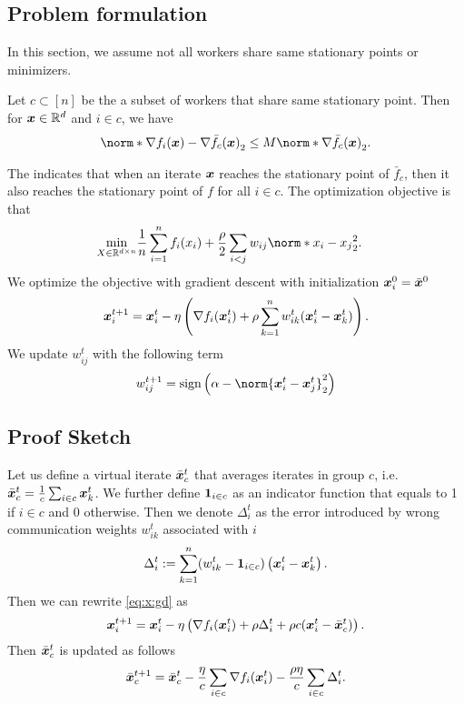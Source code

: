 \documentclass{article}
\begin{document}
\subsection{Problem formulation}
In this section, we assume not all workers share same stationary points or minimizers. 
\begin{assumption}\label{a:strong-growth}
  Let $c\subset[n]$ be the a subset of workers that share same stationary point. Then for $\bm{x}\in\mathbb{R}^d$ and $i\in c$, we have
  \begin{align*}
    \norm*{\nabla f_i(\xx) - \nabla \bar{f}_c(\xx)}_2 \le M \norm*{\nabla \bar{f}_c(\xx)}_2.
  \end{align*}
\end{assumption}
The  indicates that when an iterate $\bm{x}$ reaches the stationary point of $\bar{f}_c$, then it also reaches the stationary point of $f$ for all $i\in c$. The optimization objective is that
\begin{align*}
  \min_{X\in\mathbb{R}^{d\times n}}&  \frac{1}{n} \sum_{i=1}^n f_i(x_i) + \frac{\rho}{2} \sum_{i<j} w_{ij}\norm*{x_{i} - x_{j}}_2^2.
\end{align*}
We optimize the objective with gradient descent with initialization $\bm{x}_i^0=\bar{\bm{x}}^0$
\begin{equation}\label{eq:x:gd}
    \bm{x}_i^{t+1}=\bm{x}_i^t - \eta \left(
      \nabla f_i(\bm{x}^t_i) + \rho \sum_{k=1}^n w^t_{ik}(\bm{x}^t_i - \bm{x}^t_k)
    \right).
\end{equation}
We update $w_{ij}^t$ with the following term
\begin{align*}
  w_{ij}^{t+1} = \text{sign}\left(\alpha - \norm{\xx^t_i - \xx^t_j}_2^2 \right)
\end{align*}

\subsection{Proof Sketch}
Let us define a virtual iterate $\bar{\bm{x}}_c^t$ that averages iterates in group $c$, i.e. $\bar{\bm{x}}_c^t=\frac{1}{c}\sum_{i\in c} \bm{x}_k^t$. We further define $\bm{1}_{i\in c}$ as an indicator function that equals to 1 if $i\in c$ and 0 otherwise.
Then we denote $\Delta_i^t$ as the error introduced by wrong communication weights $w_{ik}^t$ associated with $i$
\begin{equation}\label{eq:delta}
  \Delta_i^t := \sum_{k=1}^n (w_{ik}^t - \bm{1}_{i\in c}) \left(\bm{x}_i^t - \bm{x}_k^t\right).
\end{equation} 
Then we can rewrite \eqref{eq:x:gd} as
\begin{equation}\label{eq:x:gd:delta}
  \bm{x}_i^{t+1}=\bm{x}_i^t - \eta \left(
    \nabla f_i(\bm{x}^t_i) + \rho\Delta_i^t + \rho c (\bm{x}^t_i - \bar{\bm{x}}_c^t)
  \right).
\end{equation}
Then $\bar{\bm{x}}_c^t$ is updated as follows 
\begin{equation}\label{eq:x:gd:bar_c}
  \bar{\bm{x}}_c^{t+1} = \bar{\bm{x}}_c^t - \frac{\eta}{c} \sum_{i\in c}  \nabla f_i(\bm{x}^t_i)
  - \frac{\rho\eta}{c}\sum_{i\in c} \Delta_i^t.
\end{equation}
\end{document}
